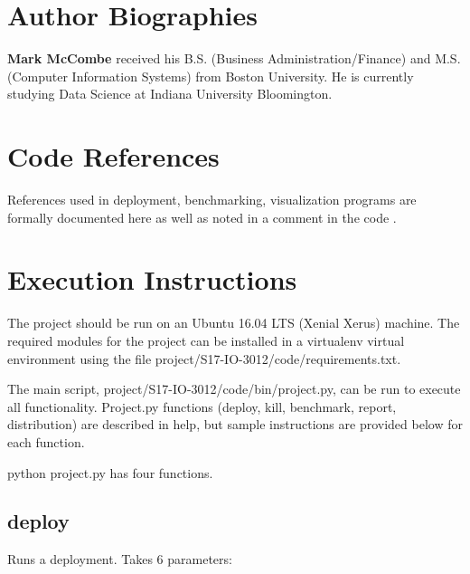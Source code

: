 \documentclass[9pt,twocolumn,twoside]{../../styles/osajnl}
\begin{document}


 
\section*{Author Biographies}
\begingroup
\setlength\intextsep{0pt}
\begin{minipage}[t][3.2cm][t]{1.0\columnwidth} %
  \noindent
{\bfseries Mark McCombe} received his B.S. (Business Administration/Finance) and M.S. (Computer Information Systems) from Boston University.  He is currently studying Data Science at Indiana University Bloomington.

\end{minipage}
\endgroup

\newpage

\appendix

\section{Code References}
References used in deployment, benchmarking, visualization programs are formally documented here as well as noted in a comment in the code \cite{www-bashNum} \cite{www-lastChar} \cite{www-configOpts} \cite{www-bashArgs} \cite{www-cmVms}  \cite{www-python1}  \cite{www-python2}  \cite{www-python3} \cite{www-ansibleDir} \cite{www-mongoAnsible} \cite{www-ansibleCopy} \cite{www-ansibleHost} \cite{www-installMongo} \cite{www-ansiblePython}.

\section{Execution Instructions}

The project should be run on an Ubuntu 16.04 LTS (Xenial Xerus) machine.  The required modules for the project can be installed in a virtualenv virtual environment using the file project/S17-IO-3012/code/requirements.txt.

The main script, project/S17-IO-3012/code/bin/project.py, can be run to execute all functionality.  Project.py functions (deploy, kill, benchmark, report, distribution) are described in help, but sample instructions are provided below for each function.

python project.py has four functions.

\subsection{deploy} Runs a deployment.  Takes 6 parameters:
\end{document}
